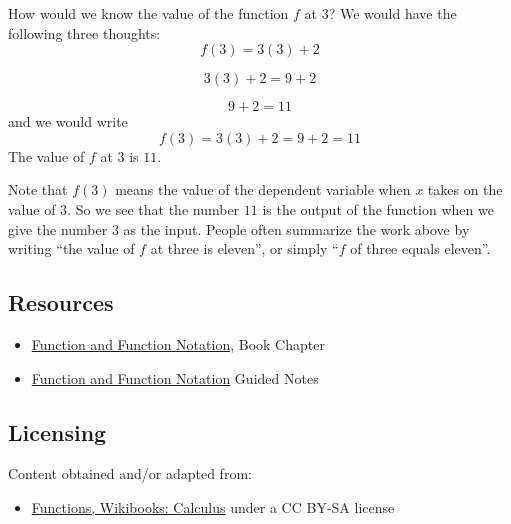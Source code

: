 How would we know the value of the function $f$ at $3$? We would have the following three thoughts:
\[
f(3) = 3(3) + 2
\]

\[
3(3) + 2 = 9 + 2
\]

\[
9 + 2 = 11
\]
and we would write
\[
f(3) = 3(3) + 2 = 9 + 2 = 11
\]
The value of $f$ at $3$ is $11$.

Note that $f(3)$ means the value of the dependent variable when $x$ takes on the value of $3$. So we see that the number $11$ is the output of the function when we give the number $3$ as the input. People often summarize the work above by writing ``the value of $f$ at three is eleven'', or simply ``$f$ of three equals eleven''.

\subsection{Resources}
\label{sss:reso-55b5}

\begin{itemize}
    \item \href{https://mathresearch.utsa.edu/wikiFiles/MAT1053/Function_and_Function_Notation/MAT1053_M1.1Functions_and_Function_Notation.pdf}{Function and Function Notation}, Book Chapter
    \item \href{https://mathresearch.utsa.edu/wikiFiles/MAT1053/Function_and_Function_Notation/MAT1053_M1.1_Functions_and_Function_NotationGN.pdf}{Function and Function Notation} Guided Notes
\end{itemize}

\subsection{Licensing}
\label{sss:lice-7352}

Content obtained and/or adapted from:

\begin{itemize}
    \item \href{https://en.wikibooks.org/wiki/Calculus/Functions}{Functions, Wikibooks: Calculus} under a CC BY-SA license
\end{itemize}

